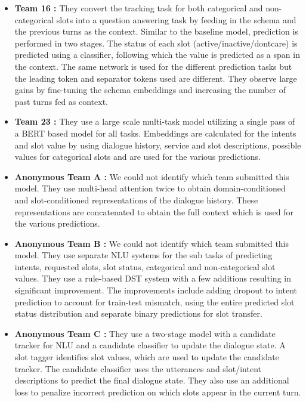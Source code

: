 \begin{itemize}
    \item \textbf{Team 16 \cite{shi2020dstc}:} They convert the tracking task for both categorical and non-categorical slots into a question answering task by feeding in the schema and the previous turns as the context. Similar to the baseline model, prediction is performed in two stages. The status of each slot (active/inactive/dontcare) is predicted using a classifier, following which the value is predicted as a span in the context. The same network is used for the different prediction tasks but the leading token and separator tokens used are different. They observe large gains by fine-tuning the schema embeddings and increasing the number of past turns fed as context.
    
    \item \textbf{Team 23 \cite{gulyaev2020dstc}:} They use a large scale multi-task model utilizing a single pass of a BERT based model for all tasks. Embeddings are calculated for the intents and slot value by using dialogue history, service and slot descriptions, possible values for categorical slots and are used for the various predictions.
    
    \item \textbf{Anonymous Team A \cite{balaraman2020dstc}:} We could not identify which team submitted this model. They use multi-head attention twice to obtain domain-conditioned and slot-conditioned representations of the dialogue history. These representations are concatenated to obtain the full context which is used for the various predictions.

    \item \textbf{Anonymous Team B \cite{li2020dstc}:} We could not identify which team submitted this model. They use separate NLU systems for the sub tasks of predicting intents, requested slots, slot status, categorical and non-categorical slot values. They use a rule-based DST system with a few additions resulting in significant improvement. The improvements include adding dropout to intent prediction to account for train-test mismatch, using the entire predicted slot status distribution and separate binary predictions for slot transfer.
    
    \item \textbf{Anonymous Team C \cite{zheng2020dstc}:} They use a two-stage model with a candidate tracker for NLU and a candidate classifier to update the dialogue state. A slot tagger identifies slot values, which are used to update the candidate tracker. The candidate classifier uses the utterances and slot/intent descriptions to predict the final dialogue state. They also use an additional loss to penalize incorrect prediction on which slots appear in the current turn.

\end{itemize}

